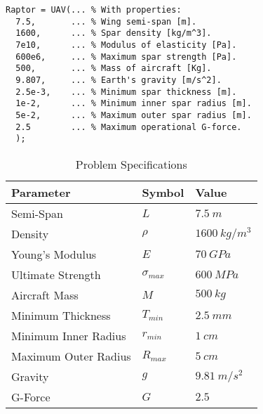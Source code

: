 \documentclass{article}
\begin{document}
\begin{lstlisting}[caption=UAV Instantiation, label=UAV, float]
% Instantiate the UAV
Raptor = UAV(... % With properties:
  7.5,       ... % Wing semi-span [m].
  1600,      ... % Spar density [kg/m^3].
  7e10,      ... % Modulus of elasticity [Pa].
  600e6,     ... % Maximum spar strength [Pa].
  500,       ... % Mass of aircraft [Kg].
  9.807,     ... % Earth's gravity [m/s^2].
  2.5e-3,    ... % Minimum spar thickness [m].
  1e-2,      ... % Minimum inner spar radius [m].
  5e-2,      ... % Maximum outer spar radius [m].
  2.5        ... % Maximum operational G-force.
  );
\end{lstlisting}

\begin{table}
\centering
\caption{Problem Specifications}
\begin{tabular}{|l|l|l|}
\hline
Parameter            & Symbol    & Value         \\ \hline
Semi-Span            & $L$       & $7.5~m$       \\ \hline
Density              & $\rho$    & $1600~kg/m^3$ \\ \hline
Young's Modulus      & $E$       & $70~GPa$      \\ \hline
Ultimate Strength             & $\sigma_{max}$  & $600~MPa$     \\ \hline
Aircraft Mass                 & $M$       & $500~kg$      \\ \hline
Minimum Thickness    & $T_{min}$ & $2.5~mm$      \\ \hline
Minimum Inner Radius & $r_{min}$ & $1~cm$        \\ \hline
Maximum Outer Radius & $R_{max}$ & $5~cm$        \\ \hline
Gravity              & $g$       & $9.81~m/s^2$  \\ \hline
G-Force              & $G$       & $2.5$         \\ \hline
\end{tabular}
\label{specs}
\end{table}
\end{document}

